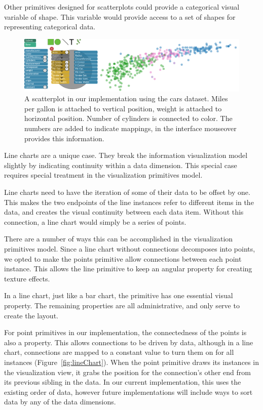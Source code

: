 Other primitives designed for scatterplots could provide a categorical visual variable of shape.
This variable would provide access to a set of shapes for representing categorical data.

\begin{figure}[t]
\centering
\includegraphics[width=\textwidth]{images/scatterplot.pdf}
\caption{A scatterplot in our implementation using the cars dataset.
Miles per gallon is attached to vertical position, weight is attached to horizontal position.
Number of cylinders is connected to color.
The numbers are added to indicate mappings, in the interface mouseover provides this information.
}
\label{fig:scatterplot}
\end{figure}

\label{lineChart}

Line charts are a unique case.
They break the information visualization model slightly by indicating continuity within a data dimension.
This special case requires special treatment in the visualization primitives model.

Line charts need to have the iteration of some of their data to be offset by one.
This makes the two endpoints of the line instances refer to different items in the data, and creates the visual continuity between each data item.
Without this connection, a line chart would simply be a series of points.

There are a number of ways this can be accomplished in the visualization primitives model.
Since a line chart without connections decomposes into points, we opted to make the points primitive allow connections between each point instance.
This allows the line primitive to keep an angular property for creating texture effects.

In a line chart, just like a bar chart, the primitive has one essential visual property.
The remaining properties are all administrative, and only serve to create the layout.

For point primitives in our implementation, the connectedness of the points is also a property.
This allows connections to be driven by data, although in a line chart, connections are mapped to a constant value to turn them on for all instances (Figure~\ref{fig:lineChart}).
When the point primitive draws its instances in the visualization view, it grabs the position for the connection's other end from its previous sibling in the data.
In our current implementation, this uses the existing order of data, however future implementations will include ways to sort data by any of the data dimensions.

